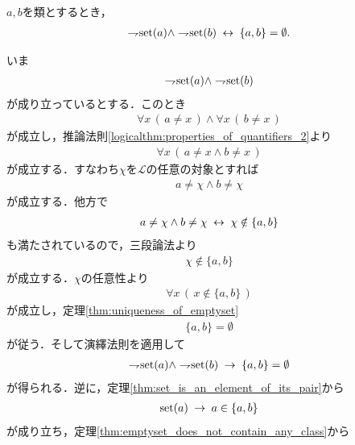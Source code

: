	\begin{screen}
		\begin{thm}[真類同士の対は空]\label{thm:pair_of_proper_classes_is_emptyset}
			$a,b$を類とするとき，
			\begin{align}
				\rightharpoondown\hspace{-0.25em} \operatorname*{set} (a) \wedge \rightharpoondown\hspace{-0.25em} \operatorname*{set} (b) \hspace{0.25em}\leftrightarrow\hspace{0.25em} \{a,b\} = \emptyset.
			\end{align}
		\end{thm}
	\end{screen}
	
	\begin{sketch}
		いま
		\begin{align}
			\rightharpoondown\hspace{-0.25em} \operatorname*{set} (a) \wedge \rightharpoondown\hspace{-0.25em} \operatorname*{set} (b)
		\end{align}
		が成り立っているとする．このとき
		\begin{align}
			\forall x\, (\, a \neq x\, ) \wedge \forall x\, (\, b \neq x\, )
		\end{align}
		が成立し，推論法則\ref{logicalthm:properties_of_quantifiers_2}より
		\begin{align}
			\forall x\, (\, a \neq x \wedge b \neq x\, )
		\end{align}
		が成立する．すなわち$\chi$を$\mathcal{L}$の任意の対象とすれば
		\begin{align}
			a \neq \chi \wedge b \neq \chi
		\end{align}
		が成立する．他方で
		\begin{align}
			a \neq \chi \wedge b \neq \chi \hspace{0.25em}\leftrightarrow\hspace{0.25em} \chi \notin \{a,b\}
		\end{align}
		も満たされているので，三段論法より
		\begin{align}
			\chi \notin \{a,b\}
		\end{align}
		が成立する．$\chi$の任意性より
		\begin{align}
			\forall x\, (\, x \notin \{a,b\}\, )
		\end{align}
		が成立し，定理\ref{thm:uniqueness_of_emptyset}
		\begin{align}
			\{a,b\} = \emptyset
		\end{align}
		が従う．そして演繹法則を適用して
		\begin{align}
			\rightharpoondown\hspace{-0.25em} \operatorname*{set} (a) \wedge \rightharpoondown\hspace{-0.25em} \operatorname*{set} (b) \hspace{0.25em}\rightarrow\hspace{0.25em} \{a,b\} = \emptyset
		\end{align}
		が得られる．逆に，定理\ref{thm:set_is_an_element_of_its_pair}から
		\begin{align}
			\operatorname*{set} (a) \hspace{0.25em}\rightarrow\hspace{0.25em} a \in \{a,b\}
		\end{align}
		が成り立ち，定理\ref{thm:emptyset_does_not_contain_any_class}から

\end{sketch}
